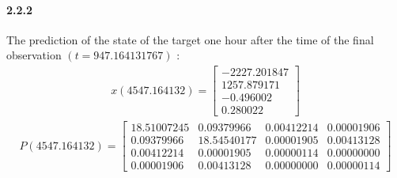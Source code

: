 \documentclass[a4paper]{article}
\begin{document}
\paragraph{2.2.2 } The prediction of the state of the target one hour after the time of the final observation $(t=947.164131767)$ : \\
\begin{align*}
x(4547.164132) = \begin{bmatrix}
  -2227.201847 \\ 
   1257.879171 \\
     -0.496002 \\
      0.280022
	\end{bmatrix}
\end{align*}
\begin{align*}
P(4547.164132) = \begin{bmatrix}
   18.51007245  &   0.09379966  &   0.00412214  &   0.00001906 \\
    0.09379966  &  18.54540177  &   0.00001905  &   0.00413128 \\
    0.00412214  &   0.00001905  &   0.00000114  &   0.00000000 \\
    0.00001906  &   0.00413128  &   0.00000000  &   0.00000114
	\end{bmatrix}
\end{align*} \\
\end{document}
